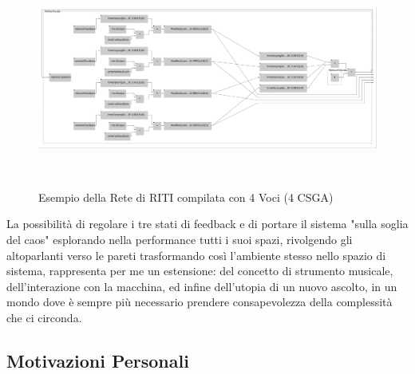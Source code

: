 \begin{figure}[h!]
\begin{center}
    \includegraphics[width=15cm]{figures/RITI4VoiceNetwork.pdf} \\
    \caption {Esempio della Rete di RITI compilata con 4 Voci (4 CSGA)} \\ 
\end{center}
\vspace{0.5cm}
\end{figure}

La possibilità di regolare i tre stati di feedback e di portare il sistema "sulla soglia del caos"
esplorando nella performance tutti i suoi spazi, 
rivolgendo gli altoparlanti verso le pareti trasformando così l'ambiente stesso
nello spazio di sistema, rappresenta per me un estensione: del concetto di strumento musicale, 
dell'interazione con la macchina, ed infine dell'utopia di un nuovo ascolto,
in un mondo dove è sempre più necessario prendere consapevolezza della complessità che ci circonda.

\subsection{Motivazioni Personali}
\label{Motivazioni Personali}


